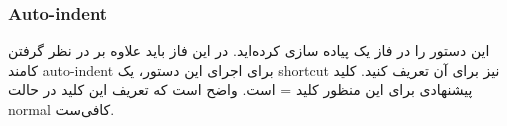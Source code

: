 \subsubsection*{{\titr Auto-indent}}


این دستور را در فاز یک پیاده سازی کرده‌اید. در این فاز باید علاوه بر در نظر گرفتن کامند auto-indent برای اجرای این دستور، یک shortcut نیز برای آن تعریف کنید. کلید پیشنهادی برای این منظور کلید = است. واضح است که تعریف این کلید در حالت normal کافی‌ست.